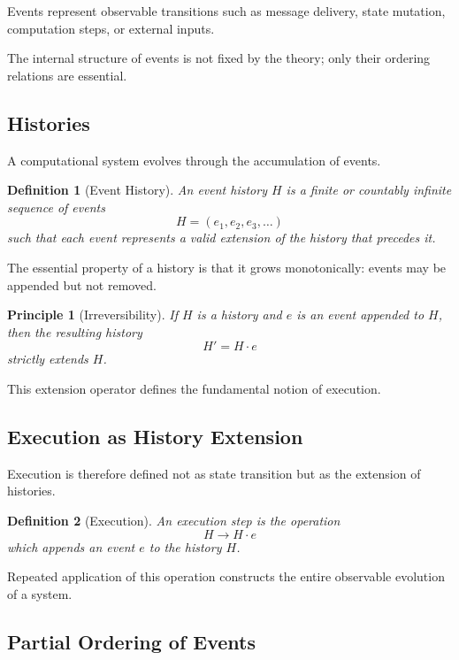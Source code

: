 \documentclass[12pt]{article}
\newtheorem{definition}{Definition}
\newtheorem{principle}{Principle}
\begin{document}
Events represent observable transitions such as message delivery,
state mutation, computation steps, or external inputs.

The internal structure of events is not fixed by the theory;
only their ordering relations are essential.

\subsection{Histories}

A computational system evolves through the accumulation of events.

\begin{definition}[Event History]
An \emph{event history} $H$ is a finite or countably infinite
sequence of events
\[
H = (e_1, e_2, e_3, \dots)
\]
such that each event represents a valid extension
of the history that precedes it.
\end{definition}

The essential property of a history is that it grows monotonically:
events may be appended but not removed.

\begin{principle}[Irreversibility]
If $H$ is a history and $e$ is an event appended to $H$,
then the resulting history
\[
H' = H \cdot e
\]
strictly extends $H$.
\end{principle}

This extension operator defines the fundamental notion of execution.

\subsection{Execution as History Extension}

Execution is therefore defined not as state transition
but as the extension of histories.

\begin{definition}[Execution]
An execution step is the operation
\[
H \rightarrow H \cdot e
\]
which appends an event $e$ to the history $H$.
\end{definition}

Repeated application of this operation constructs
the entire observable evolution of a system.

\subsection{Partial Ordering of Events}
\end{document}
